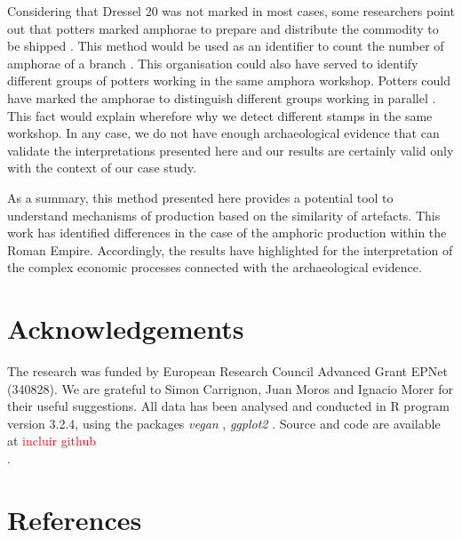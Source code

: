 \documentclass[review]{elsarticle}
\newcommand{\memo}[2]{\textcolor{#1}{#2}}
\newcommand{\maria}[1]{\memo{red}{#1\\}}
\begin{document}
Considering that Dressel 20 was not marked in most cases, some researchers point out that potters marked amphorae to prepare and distribute the commodity to be shipped \citep{berni_millet_epigrafianforica_2008}. This method would be used as an identifier to count the number of amphorae of a branch \citep{juanmorostesis}. This organisation could also have served to identify different groups of potters working in the same amphora workshop. Potters could have marked the amphorae to distinguish different groups working in parallel \citep{li_crossbows_2014}. This fact would explain wherefore why we detect different stamps in the same workshop. In any case, we do not have enough archaeological evidence that can validate the interpretations presented here and our results are certainly valid only with the context of our case study. 

As a summary, this method presented here provides a potential tool to understand mechanisms of production based on the similarity of artefacts. This work has identified differences in the case of the amphoric production within the Roman Empire. Accordingly, the results have highlighted for the interpretation of the complex economic processes connected with the archaeological evidence. 


\section{Acknowledgements}

The research was funded by European Research Council Advanced Grant EPNet (340828). We are grateful to Simon Carrignon, Juan Moros and Ignacio Morer for their useful suggestions.  
All data has been analysed and conducted in R program version 3.2.4, using the packages \textit{vegan} \citep{oksanen_vegan_2007}, \textit{ggplot2} \citep{ggplot2:_2016}. Source and code are available at \maria{incluir github}. 


\section{References}

%

\end{document}
